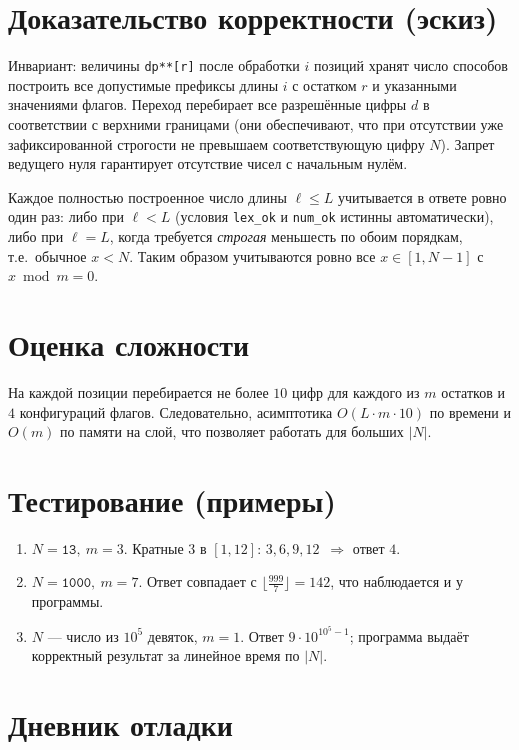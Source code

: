 \documentclass[12pt,a4paper]{article}
\begin{document}
\section*{Доказательство корректности (эскиз)}

Инвариант: величины \texttt{dp**[r]} после обработки $i$ позиций хранят число способов построить все допустимые префиксы длины $i$ с остатком $r$ и указанными значениями флагов.
Переход перебирает все разрешённые цифры $d$ в соответствии с верхними границами (они обеспечивают, что при отсутствии уже зафиксированной строгости не превышаем соответствующую цифру $N$).
Запрет ведущего нуля гарантирует отсутствие чисел с начальным нулём.

Каждое полностью построенное число длины $\ell \le L$ учитывается в ответе ровно один раз: либо при $\ell<L$ (условия \texttt{lex\_ok} и \texttt{num\_ok} истинны автоматически), либо при $\ell=L$, когда требуется \emph{строгая} меньшесть по обоим порядкам, т.е.\ обычное $x<N$.
Таким образом учитываются ровно все $x\in[1,N-1]$ с $x\bmod m=0$.

\section*{Оценка сложности}

На каждой позиции перебирается не более $10$ цифр для каждого из $m$ остатков и $4$ конфигураций флагов.
Следовательно, асимптотика $O(L\cdot m\cdot 10)$ по времени и $O(m)$ по памяти на слой, что позволяет работать для больших $|N|$.

\section*{Тестирование (примеры)}

\begin{enumerate}
  \item $N=\texttt{13},\ m=3$. Кратные $3$ в $[1,12]$: $3,6,9,12$~$\Rightarrow$ ответ $4$.
  \item $N=\texttt{1000},\ m=7$. Ответ совпадает с $\big\lfloor \tfrac{999}{7}\big\rfloor=142$, что наблюдается и у программы.
  \item $N$ --- число из $10^5$ девяток, $m=1$. Ответ $9\cdot 10^{10^5-1}$; программа выдаёт корректный результат за линейное время по $|N|$.
\end{enumerate}

\section*{Дневник отладки}
\end{document}

